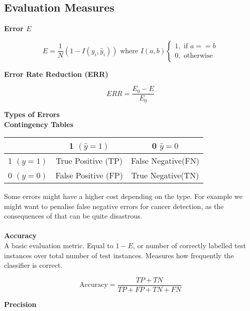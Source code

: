 \documentclass[a4paper,10pt]{article}
\begin{document}
\subsection*{Evaluation Measures}
\textcolor{Periwinkle}{\textbf{Error $E$}}
\begin{shaded}
	\begin{equation*}
		E = \frac{1}{N}(1 - I(y_{i}, \hat{y}_{i}))\text{  where  } I(a,b)
		\begin{cases}
			1, \text{  if } a == b \\
			0, \text{  otherwise}
		\end{cases}
	\end{equation*}
\end{shaded}
\noindent \textcolor{Periwinkle}{\textbf{Error Rate Reduction (ERR)}}
\begin{shaded}
	\begin{equation*}
		ERR = \frac{E_{0} - E}{E_{0}}
	\end{equation*}
\end{shaded}
\textcolor{Periwinkle}{\textbf{Types of Errors}}\\
\textbf{Contingency Tables}
\begin{center}
	\begin{tabular}{|c|c|c|}
		\hline 
		&1 $(\hat{y} = 1)$ &0 $\hat{y} = 0$\\
		\hline
		1 $(y = 1)$ &True Positive (TP) &False Negative(FN) \\
		\hline 
		0 $(y = 0)$ &False Positive (FP) &True Negative(TN) \\
		\hline 
	\end{tabular}
\end{center}
\noindent Some errors might have a higher cost depending on the type. For example we might want to penalise false negative errors for cancer detection, as the consequences of that can be quite disastrous.  \\\\
\textcolor{Periwinkle}{\textbf{Accuracy}}\\
A basic evaluation metric. Equal to $1 - E$, or number of correctly labelled test instances over total number of test instances. Measures how frequently the classifier is correct. 
\begin{shaded}
	\begin{equation*}
		\text{Accuracy} = \frac{TP + TN}{TP + FP + TN + FN}
	\end{equation*}
\end{shaded}
\noindent \textcolor{Periwinkle}{\textbf{Precision}}\\
\end{document}

